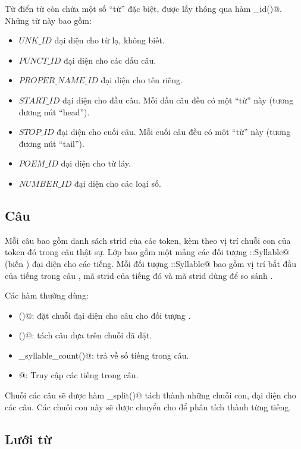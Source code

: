 \documentclass[a4paper,oneside,14pt]{extbook} %
\begin{document}
Từ điển từ còn chứa một số ``từ'' đặc biệt, được lấy thông qua hàm
\verb@get_id()@. Những từ này bao gồm:
\begin{itemize}
\item $UNK\_ID$  đại diện cho từ lạ, không biết.
\item $PUNCT\_ID$ đại diện cho các dấu câu.
\item $PROPER\_NAME\_ID$ đại diện cho tên riêng.
\item $START\_ID$ đại diện cho đầu câu. Mỗi đầu câu đều có một ``từ''
  này (tương đương nút ``head'').
\item $STOP\_ID$ đại diện cho cuối câu. Mỗi cuối câu đều có một ``từ''
  này (tương đương nút ``tail'').
\item $POEM\_ID$ đại diện cho từ láy.
\item $NUMBER\_ID$ đại diện cho các loại số.
\end{itemize}

\subsection{Câu}

Mỗi câu bao gồm danh sách strid của các token, kèm theo vị trí chuỗi
con của token đó trong câu thật sự. Lớp \verb@Sentence@ bao gồm một
mảng các đối tượng \verb@Sentence::Syllable@ (biến \verb@syllables@) đại diện cho các
tiếng. Mỗi đối tượng \verb@Sentence::Syllable@ bao gồm vị trí bắt đầu
của tiếng trong câu \verb@start@, mã strid của tiếng đó \verb@id@ và
mã strid dùng để so sánh \verb@cid@.

Các hàm thường dùng:
\begin{itemize}
\item \verb@set()@: đặt chuỗi đại diện cho câu cho đối tượng
  \verb@Sentence@. 
\item \verb@tokenize()@: tách câu dựa trên chuỗi đã đặt.
\item \verb@get_syllable_count()@: trả về số tiếng trong câu.
\item \verb@operator[]@: Truy cập các tiếng trong câu.
\end{itemize}

Chuỗi các câu sẽ được hàm \verb@sentences_split()@ tách thành những
chuỗi con, đại diện cho các câu. Các chuỗi con này sẽ được chuyển cho
\verb@Sentence@ để phân tích thành từng tiếng.

\subsection{Lưới từ}
\end{document}

